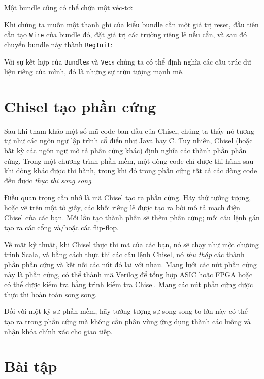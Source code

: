 \documentclass[%
    10pt,
    headinclude, footexclude,
    openright, %
    notitlepage,
    cleardoubleempty,
    headsepline,
    pointlessnumbers,
    bibtotoc, idxtotoc,
    ]{scrbook}
\newcommand{\code}[1]{{\small{\texttt{#1}}}}
\begin{document}

\noindent Một bundle cũng có thể chứa một véc-tơ:


Khi chúng ta muốn một thanh ghi của kiểu bundle cần một giá trị reset,
đầu tiên cần tạo \code{Wire} của bundle đó, đặt giá trị các trường riêng lẻ nếu cần, 
và sau đó chuyển bundle này thành \code{RegInit}:


Với sự kết hợp của \code{Bundle}s và \code{Vec}s chúng ta có thể định nghĩa các cấu trúc dữ liệu riêng của mình,
đó là những sự trừu tượng mạnh mẽ.

\section{Chisel tạo phần cứng}

Sau khi tham khảo một số mã code ban đầu của Chisel, chúng ta thấy nó tương tự như các
ngôn ngữ lập trình cổ điển như Java hay C. Tuy nhiên, Chisel (hoặc bất kỳ các ngôn ngữ
mô tả phần cứng khác) định nghĩa các thành phần phần cứng. Trong một chương trình
phần mềm, một dòng code chỉ được thi hành sau khi dòng khác được thi hành, trong khi đó 
trong phần cứng tất cả các dòng code đều được \emph{thực thi song song}.

Điều quan trọng cần nhớ là mã Chisel tạo ra phần cứng. 
Hãy thử tưởng tượng, hoặc vẽ trên một tờ giấy, các khối riêng lẻ được 
tạo ra bởi mô tả mạch điện Chisel của các bạn. Mỗi lần tạo thành phần sẽ thêm phần cứng; 
mỗi câu lệnh gán tạo ra các cổng và/hoặc các flip-flop.

Về mặt kỹ thuật, khi Chisel thực thi mã của các bạn, nó sẽ chạy như một chương trình Scala,
và bằng cách thực thi các câu lệnh Chisel, nó \emph{thu thập} các thành phần phần cứng
và kết nối các nút đó lại với nhau. Mạng lưới các nút phần cứng này là phần cứng, 
có thể thành mã Verilog để tổng hợp ASIC hoặc FPGA hoặc có thể được kiểm tra bằng trình kiểm tra Chisel. 
Mạng các nút phần cứng được thực thi hoàn toàn song song.

Đối với một kỹ sư phần mềm, hãy tưởng tượng sự song song to lớn này có thể 
tạo ra trong phần cứng mà không cần phân vùng ứng dụng thành các luồng
và nhận khóa chính xác cho giao tiếp.

\section{Bài tập}
\end{document}
